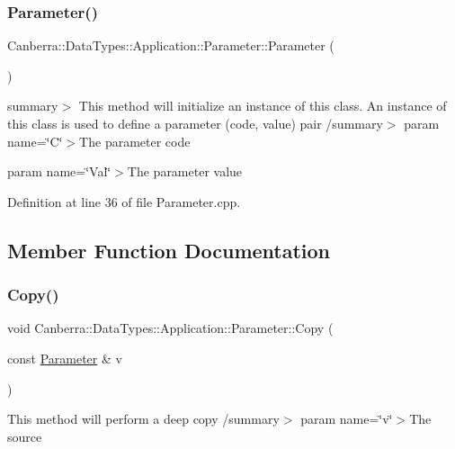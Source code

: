 \subsubsection{\texorpdfstring{Parameter()}{Parameter()}\hspace{0.1cm}{\footnotesize\ttfamily [2/2]}}
{\footnotesize\ttfamily Canberra\+::\+Data\+Types\+::\+Application\+::\+Parameter\+::\+Parameter (\begin{DoxyParamCaption}{ }\end{DoxyParamCaption})}

summary$>$ This method will initialize an instance of this class. An instance of this class is used to define a parameter (code, value) pair /summary$>$ param name=\char`\"{}\+C\char`\"{}$>$The parameter code

param name=\char`\"{}\+Val\char`\"{}$>$The parameter value

Definition at line 36 of file Parameter.\+cpp.



\subsection{Member Function Documentation}
\mbox{\label{class_canberra_1_1_data_types_1_1_application_1_1_parameter_ada8595efa9f0042d73fc1a684bad0d81_ada8595efa9f0042d73fc1a684bad0d81}} 
\subsubsection{\texorpdfstring{Copy()}{Copy()}}
{\footnotesize\ttfamily void Canberra\+::\+Data\+Types\+::\+Application\+::\+Parameter\+::\+Copy (\begin{DoxyParamCaption}\item[{const \hyperlink{class_canberra_1_1_data_types_1_1_application_1_1_parameter}{Parameter} \&}]{v }\end{DoxyParamCaption})\hspace{0.3cm}{\ttfamily [protected]}}



This method will perform a deep copy /summary$>$ param name=\char`\"{}v\char`\"{}$>$The source


